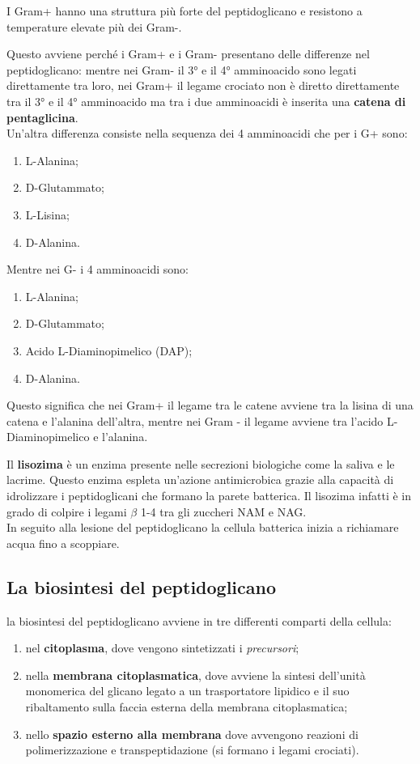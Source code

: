 \documentclass[11pt]{book}
\begin{document}
I Gram+ hanno una struttura più forte del peptidoglicano e resistono a temperature elevate più dei Gram-.

Questo avviene perché i Gram+ e i Gram- presentano delle differenze nel peptidoglicano: mentre nei Gram- il 3° e il 4° amminoacido sono legati direttamente tra loro, nei Gram+ il legame crociato non è diretto direttamente tra il 3° e il 4° amminoacido ma tra i due amminoacidi è inserita una \textbf{catena di pentaglicina}.\\
Un’altra differenza consiste nella sequenza dei 4 amminoacidi che per i G+ sono: 
\begin{enumerate}
\item L-Alanina;
\item D-Glutammato;
\item L-Lisina;
\item D-Alanina.
\end{enumerate}

Mentre nei G- i 4 amminoacidi sono:
\begin{enumerate}
\item L-Alanina;
\item D-Glutammato;
\item Acido L-Diaminopimelico (DAP);
\item D-Alanina.
\end{enumerate}

Questo significa che nei Gram+ il legame tra le catene avviene tra la lisina di una catena e l’alanina dell’altra, mentre nei Gram - il legame avviene tra l’acido L-Diaminopimelico e l’alanina.

\vspace{2em}
Il \textbf{lisozima} è un enzima presente nelle secrezioni biologiche come la saliva e le lacrime.
Questo enzima espleta un'azione antimicrobica grazie alla capacità di idrolizzare i peptidoglicani che formano la parete batterica. Il lisozima infatti è in grado di colpire i legami $\beta$ 1-4 tra gli zuccheri NAM e NAG.\\
In seguito alla lesione del peptidoglicano la cellula batterica inizia a richiamare acqua fino a scoppiare.


\subsection{La biosintesi del peptidoglicano}

la biosintesi del peptidoglicano avviene in tre differenti comparti della cellula:
\begin{enumerate}
\item nel \textbf{citoplasma}, dove vengono sintetizzati i \emph{precursori};
\item nella \textbf{membrana citoplasmatica}, dove avviene la sintesi dell’unità monomerica del glicano legato a un trasportatore lipidico e il suo ribaltamento sulla faccia esterna della membrana citoplasmatica;
\item nello \textbf{spazio esterno alla membrana} dove avvengono reazioni di polimerizzazione e transpeptidazione (si formano i legami crociati).
\end {enumerate}
\end{document}
